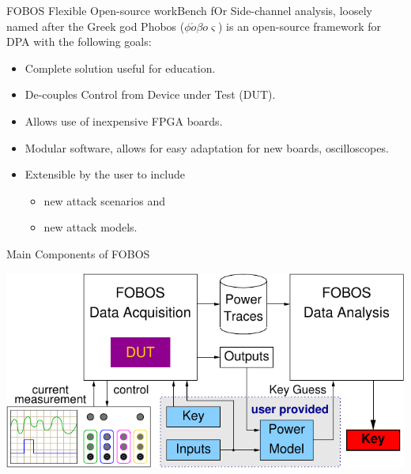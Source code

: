 \documentclass[xcolor=pdftex,dvipsnames,table,final]{beamer}
\begin{document}
\begin{frame}[fragile]{}
\begin{columns}[t]
\begin{column}{.31\linewidth}
      \begin{block}{FOBOS}
        {\color{red}F}lexible {\color{red}O}pen-source work{\color{red}B}ench 
        f{\color{red}O}r {\color{red}S}ide-channel analysis, 
          loosely named after the Greek god Phobos ($\phi \acute{o} \beta o \varsigma$) is 
          an open-source framework for DPA with the following goals: 
        \begin{itemize}
          \item Complete solution useful for education.
          \item De-couples Control from Device under Test (DUT).
          \item Allows use of inexpensive FPGA boards.
          \item Modular software, allows for easy adaptation for new boards, oscilloscopes.
          \item Extensible by the user to include
          \begin{itemize}
            \item new attack scenarios and
            \item new attack models. 
          \end{itemize}
        \end{itemize}
      \end{block}
      \begin{block}{Main Components of FOBOS}
        \begin{center}
          \includegraphics[scale=1.5]{../figures/fobos-top}
        \end{center} 
      \end{block}
     

\end{column}
\end{columns}
\end{frame}
\end{document}
